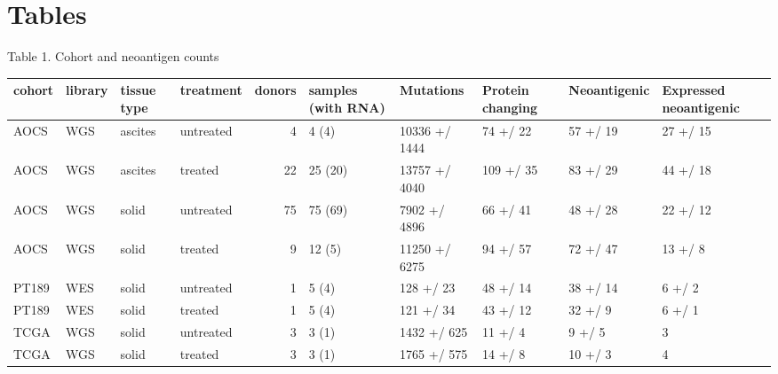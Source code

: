 \section{Tables}

Table 1. Cohort and neoantigen counts

\begin{tabular}{llllrlllll}
\toprule
cohort & library & tissue type &  treatment &  donors & samples (with RNA) &      Mutations & Protein changing & Neoantigenic & Expressed neoantigenic \\
\midrule
  AOCS &     WGS &     ascites &  untreated &       4 &              4 (4) &  10336 +/ 1444 &         74 +/ 22 &     57 +/ 19 &               27 +/ 15 \\
  AOCS &     WGS &     ascites &    treated &      22 &            25 (20) &  13757 +/ 4040 &        109 +/ 35 &     83 +/ 29 &               44 +/ 18 \\
  AOCS &     WGS &       solid &  untreated &      75 &            75 (69) &   7902 +/ 4896 &         66 +/ 41 &     48 +/ 28 &               22 +/ 12 \\
  AOCS &     WGS &       solid &    treated &       9 &             12 (5) &  11250 +/ 6275 &         94 +/ 57 &     72 +/ 47 &                13 +/ 8 \\
 PT189 &     WES &       solid &  untreated &       1 &              5 (4) &      128 +/ 23 &         48 +/ 14 &     38 +/ 14 &                 6 +/ 2 \\
 PT189 &     WES &       solid &    treated &       1 &              5 (4) &      121 +/ 34 &         43 +/ 12 &      32 +/ 9 &                 6 +/ 1 \\
  TCGA &     WGS &       solid &  untreated &       3 &              3 (1) &    1432 +/ 625 &          11 +/ 4 &       9 +/ 5 &                      3 \\
  TCGA &     WGS &       solid &    treated &       3 &              3 (1) &    1765 +/ 575 &          14 +/ 8 &      10 +/ 3 &                      4 \\
\bottomrule
\end{tabular}